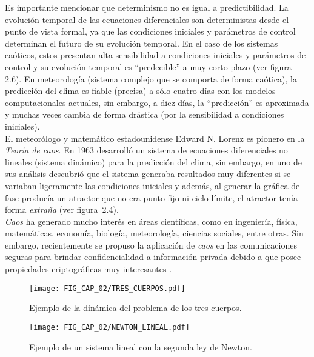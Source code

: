 Es importante mencionar que determinismo no es igual a predictibilidad. La evolución temporal de las ecuaciones diferenciales son deterministas desde el punto de vista formal, ya que las condiciones iniciales y parámetros de control determinan el futuro de su evolución temporal. En el caso de los sistemas caóticos, estos presentan alta sensibilidad a condiciones iniciales y parámetros de control y su evolución temporal es ``predecible'' a muy corto plazo (ver figura 2.6). En meteorología (sistema complejo que se comporta de forma caótica), la predicción del clima es fiable (precisa) a sólo cuatro días con los modelos computacionales actuales, sin embargo, a diez días, la ``predicción'' es aproximada y muchas veces cambia de forma drástica (por la sensibilidad a condiciones iniciales). \\
  
El meteorólogo y matemático estadounidense Edward N. Lorenz es pionero en la \textit{Teoría de caos}. En 1963 desarrolló un sistema de ecuaciones diferenciales no lineales (sistema dinámico) para la predicción del clima, sin embargo, en uno de sus análisis descubrió que el sistema generaba resultados muy diferentes si se variaban ligeramente las condiciones iniciales y además, al generar la gráfica de fase producía un atractor que no era punto fijo ni ciclo límite, el atractor tenía forma \textit{extraña} (ver figura~2.4). \\

\textit{Caos} ha generado mucho interés en áreas científicas, como en ingeniería, física, matemáticas, economía, biología, meteorología, ciencias sociales, entre otras. Sin embargo, recientemente se propuso la aplicación de \textit{caos} en las comunicaciones seguras para brindar confidencialidad a información privada debido a que posee propiedades criptográficas muy interesantes \cite{PyC_1990}. \\

\begin{figure}[!htbp] %
	\center
	\texttt{[image: FIG\_CAP\_02/TRES\_CUERPOS.pdf]}  
	\caption{Ejemplo de la dinámica del problema de los tres cuerpos.}
\end{figure}

\begin{figure}[!htbp] %
	\center
	\texttt{[image: FIG\_CAP\_02/NEWTON\_LINEAL.pdf]}  
	\caption{Ejemplo de un sistema lineal con la segunda ley de Newton.}
\end{figure}

